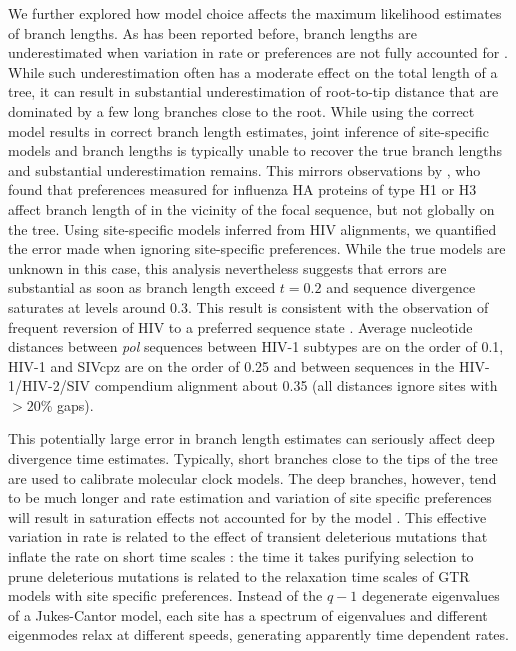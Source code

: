 \documentclass[aps,rmp,twocolumn]{revtex4}
\newcommand{\gene}[1]{{\it #1}}
\begin{document}
We further explored how model choice affects the maximum likelihood estimates of branch lengths.
As has been reported before, branch lengths are underestimated when variation in rate or preferences are not fully accounted for \citep{halpern1998evolutionary,hilton_modeling_2018}.
While such underestimation often has a moderate effect on the total length of a tree, it can result in substantial underestimation of root-to-tip distance that are dominated by a few long branches close to the root.
While using the correct model results in correct branch length estimates, joint inference of site-specific models and branch lengths is typically unable to recover the true branch lengths and substantial underestimation remains.
This mirrors observations by \citet{hilton_modeling_2018}, who found that preferences measured for influenza HA proteins of type H1 or H3 affect branch length of in the vicinity of the focal sequence, but not globally on the tree.
Using site-specific models inferred from HIV alignments, we quantified the error made when ignoring site-specific preferences.
While the true models are unknown in this case, this analysis nevertheless suggests that errors are substantial as soon as branch length exceed $t=0.2$ and sequence divergence saturates at levels around 0.3.
This result is consistent with the observation of frequent reversion of HIV to a preferred sequence state \citep{zanini2015population,carlson_selection_2014,leslie_hiv_2004}.
Average nucleotide distances between \gene{pol} sequences between HIV-1 subtypes are on the order of 0.1, HIV-1 and SIVcpz are on the order of 0.25 and between sequences in the HIV-1/HIV-2/SIV compendium alignment about 0.35 (all distances ignore sites with $>20$\% gaps).


This potentially large error in branch length estimates can seriously affect deep divergence time estimates.
Typically, short branches close to the tips of the tree are used to calibrate molecular clock models.
The deep branches, however, tend to be much longer and rate estimation and variation of site specific preferences will result in saturation effects not accounted for by the model \citep{hilton_modeling_2018}.
This effective variation in rate is related to the effect of transient deleterious mutations that inflate the rate on short time scales \citep{ho_time_2005,wertheim_purifying_2011}: the time it takes purifying selection to prune deleterious mutations is related to the relaxation time scales of GTR models with site specific preferences.
Instead of the $q-1$ degenerate eigenvalues of a Jukes-Cantor model, each site has a spectrum of eigenvalues and different eigenmodes relax at different speeds, generating apparently time dependent rates.
\end{document}

